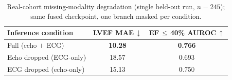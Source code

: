 \begin{table}[t]
\centering
\caption{Real-cohort missing-modality degradation (single held-out run, \mbox{$n=245$}); same fused
checkpoint, one branch masked per condition.}
\label{tab:degradation}
\small
\begin{tabular}{@{}lcc@{}}
\toprule
\textbf{Inference condition} & \textbf{LVEF MAE}\,$\downarrow$ & \textbf{EF\,$\leq$\,40\% AUROC}\,$\uparrow$ \\
\midrule
Full (echo $+$ ECG)        & \textbf{10.28} & \textbf{0.766} \\
Echo dropped (ECG-only)    & 18.57          & 0.693 \\
ECG dropped (echo-only)    & 15.13          & 0.750 \\
\bottomrule
\end{tabular}
\end{table}

